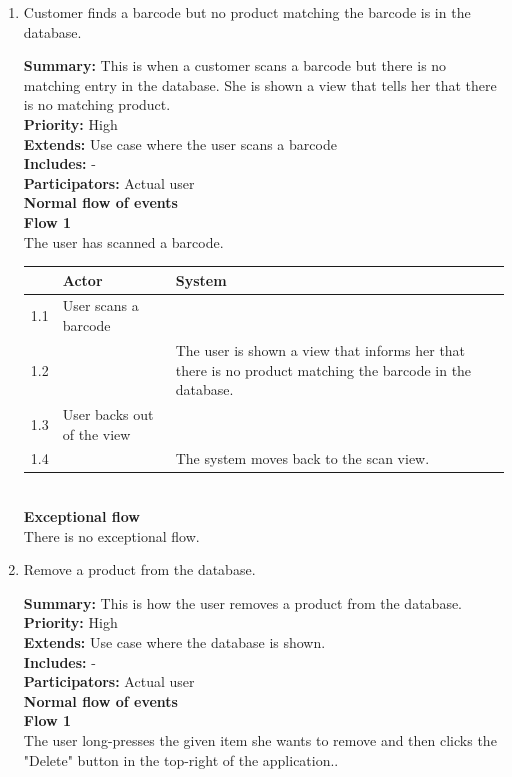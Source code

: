 \documentclass{report}
\begin{document}
\begin{enumerate}
\pagebreak

  \item Customer finds a barcode but no product matching the barcode is in the database. \

    \textbf{Summary:} This is when a customer scans a barcode but there is no matching entry in the database. She is shown a view that tells her that there is no matching product. \\
    \textbf{Priority:} High \\
    \textbf{Extends:} Use case where the user scans a barcode \\
    \textbf{Includes:} - \\
    \textbf{Participators:} Actual user \\
    \textbf{Normal flow of events} \\
    \textbf{Flow 1} \\ The user has scanned a barcode. \\

    \begin{tabular}{ | l | p{4cm} | p{4cm} |}
    \hline
      & Actor & System \\ \hline
    1.1 & User scans a barcode & \\ \hline
    1.2 & & The user is shown a view that informs her that there is no product matching the barcode in the database. \\ \hline
    1.3 & User backs out of the view & \\ \hline
    1.4 & & The system moves back to the scan view. \\
    \hline
    \end{tabular} \\

    \textbf{Exceptional flow} \\ There is no exceptional flow.

\pagebreak

  \item Remove a product from the database. \

    \textbf{Summary:} This is how the user removes a product from the database. \\
    \textbf{Priority:} High \\
    \textbf{Extends:} Use case where the database is shown. \\
    \textbf{Includes:} - \\
    \textbf{Participators:} Actual user \\
    \textbf{Normal flow of events} \\
    \textbf{Flow 1} \\ The user long-presses the given item she wants to remove and then clicks the "Delete" button in the top-right of the application.. \\


\end{enumerate}
\end{document}
